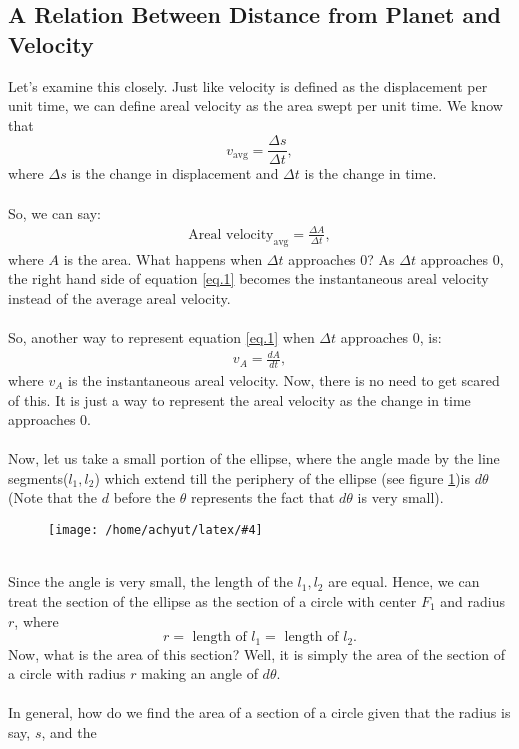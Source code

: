 \documentclass[a4paper]{report}
\newcommand{\mkfig}[5]{
  \begin{figure}[#1]
    \centering
    \texttt{[image: /home/achyut/latex/\#4]}
    \caption{\centering{#5}}
    \label{fig.#2}
  \end{figure}
}
\begin{document}
\subsection{A Relation Between Distance from Planet and Velocity}\label{sec.1}
Let's examine this closely. Just like velocity is defined as the displacement per unit time, we can define 
areal velocity as the area swept per unit time. We know that $$v_{\text{avg}}=\frac{\Delta s}{\Delta t},$$
where $\Delta s$ is the change in displacement and $\Delta t$ is the change in time. \\\\
So, we can say: 
\begin{align} \label{eq.1}
  \text{Areal velocity}_\text{avg} = \frac{\Delta A}{\Delta t},
\end{align}
where $A$ is the area.
What happens when $\Delta t$ approaches $0$? As $\Delta t$ approaches 0, the right hand side of equation \ref{eq.1}
becomes the instantaneous areal velocity instead of the average areal velocity. \\\\
So, another way to represent equation \ref{eq.1} when $\Delta t$ approaches 0, is: 
\begin{align} \label{eq.2}
  v_A=\frac{dA}{dt},
\end{align}
where $v_A$ is the instantaneous areal velocity. Now, there is no need to get scared of this. It is just a way
to represent the areal velocity as the change in time approaches 0. \\\\
Now, let us take a small portion of the ellipse, where the angle made by the line segments($l_1,l_2$) 
which extend till the periphery of the ellipse (see figure \ref{fig.3})is $d\theta$ (Note that the $d$ before the
$\theta$ represents the fact that $d\theta$ is very small). \\
\mkfig{h!}{3}{2}{presentation.3.png}{Section of ellipse} \\
Since the angle is very small, the length of the $l_1,l_2$ are equal. Hence, we can treat the section of the 
ellipse as the section of a circle with center $F_1$ and radius $r$, where 
$$r=\text{ length of }l_1=\text{ length of }l_2.$$
Now, what is the area of this section? Well, it is simply the area of the section of a circle with radius
$r$ making an angle of $d\theta$. \\
\\
In general, how do we find the area of a section of a circle given that the radius is say, $s$, and the 
\end{document}
